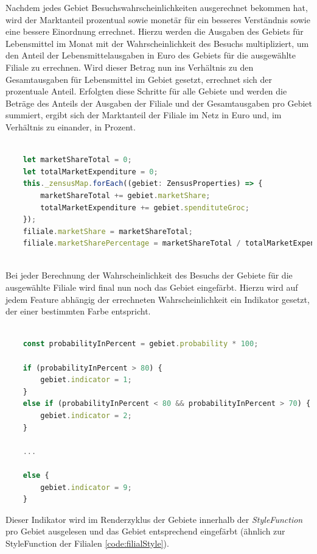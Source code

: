 Nachdem jedes Gebiet Besuchswahrscheinlichkeiten ausgerechnet bekommen hat, wird der Marktanteil prozentual sowie monetär für ein besseres Verständnis sowie eine bessere Einordnung errechnet.
Hierzu werden die Ausgaben des Gebiets für Lebensmittel im Monat mit der Wahrscheinlichkeit des Besuchs multipliziert, um den Anteil der Lebensmittelausgaben in Euro des Gebiets für die ausgewählte Filiale zu errechnen.
Wird dieser Betrag nun ins Verhältnis zu den Gesamtausgaben für Lebensmittel im Gebiet gesetzt, errechnet sich der prozentuale Anteil.
Erfolgten diese Schritte für alle Gebiete und werden die Beträge des Anteils der Ausgaben der Filiale und der Gesamtausgaben pro Gebiet summiert, ergibt sich der Marktanteil der Filiale im Netz in Euro und, im Verhältnis zu einander, in Prozent.

\begin{lstlisting}[language=JavaScript, caption={Martkanteil Berechnung}]
	
	let marketShareTotal = 0;
	let totalMarketExpenditure = 0;
	this._zensusMap.forEach((gebiet: ZensusProperties) => {
		marketShareTotal += gebiet.marketShare;
		totalMarketExpenditure += gebiet.spendituteGroc;
	});
	filiale.marketShare = marketShareTotal;
	filiale.marketSharePercentage = marketShareTotal / totalMarketExpenditure;
	
\end{lstlisting}

Bei jeder Berechnung der Wahrscheinlichkeit des Besuchs der Gebiete für die ausgewählte Filiale wird final nun noch das Gebiet eingefärbt.
Hierzu wird auf jedem Feature abhängig der errechneten Wahrscheinlichkeit ein Indikator gesetzt, der einer bestimmten Farbe entspricht.

\begin{lstlisting}[language=JavaScript, caption={Setzen des Einfärbeindikators}]
	
	const probabilityInPercent = gebiet.probability * 100;
	
	if (probabilityInPercent > 80) {
		gebiet.indicator = 1;
	}
	else if (probabilityInPercent < 80 && probabilityInPercent > 70) {
		gebiet.indicator = 2;
	}

	...
	
	else {
		gebiet.indicator = 9;
	}
\end{lstlisting}


Dieser Indikator wird im Renderzyklus der Gebiete innerhalb der \emph{StyleFunction} pro Gebiet ausgelesen und das Gebiet entsprechend eingefärbt (ähnlich zur StyleFunction der Filialen \ref{code:filialStyle}).

